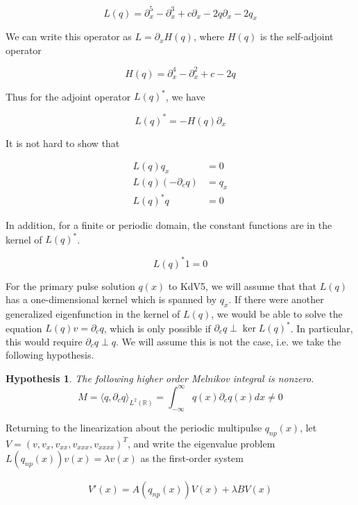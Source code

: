 \documentclass[12pt]{article}
\def\R{{\mathbb R}}
\newtheorem{hypothesis}{Hypothesis}
\begin{document}
\begin{equation}
L(q) = \partial_x^5 - \partial_x^3 + c \partial_x
 - 2 q \partial_x - 2 q_x
\end{equation}

We can write this operator as $L = \partial_x H(q)$, where $H(q)$ is the self-adjoint operator

\begin{equation}
H(q) = \partial_x^4 - \partial_x^2 + c - 2 q
\end{equation}

Thus for the adjoint operator $L(q)^*$, we have

\begin{equation}
L(q)^* = -H(q) \partial_x
\end{equation}

It is not hard to show that

\begin{align*}
L(q)q_x &= 0 \\
L(q)(-\partial_c q) &= q_x \\
L(q)^* q &= 0
\end{align*}

In addition, for a finite or periodic domain, the constant functions are in the kernel of $L(q)^*$.

\[
L(q)^* 1 = 0
\]

For the primary pulse solution $q(x)$ to KdV5, we will assume that that $L(q)$ has a one-dimensional kernel which is spanned by $q_x$. If there were another generalized eigenfunction in the kernel of $L(q)$, we would be able to solve the equation $L(q) v = \partial_c q$, which is only possible if $\partial_c q \perp \ker L(q)^*$. In particular, this would require $\partial_c q \perp q$. We will assume this is not the case, i.e. we take the following hypothesis.

\begin{hypothesis}\label{Melnikovnonzero}
The following higher order Melnikov integral is nonzero.
\[
M = \langle q, \partial_c q \rangle_{L^2(\R)} 
= \int_{-\infty}^\infty q(x) \partial_c q(x) dx \neq 0
\]
\end{hypothesis}

Returning to the linearization about the periodic multipulse $q_{np}(x)$, let $V = (v, v_x, v_{xx}, v_{xxx}, v_{xxxx})^T$, and write the eigenvalue problem $L(q_{np}(x))v(x) = \lambda v(x)$ as the first-order system

\begin{align}\label{PDEeig}
V'(x) = A(q_{np}(x)) V(x) + \lambda B V(x)
\end{align}
\end{document}
